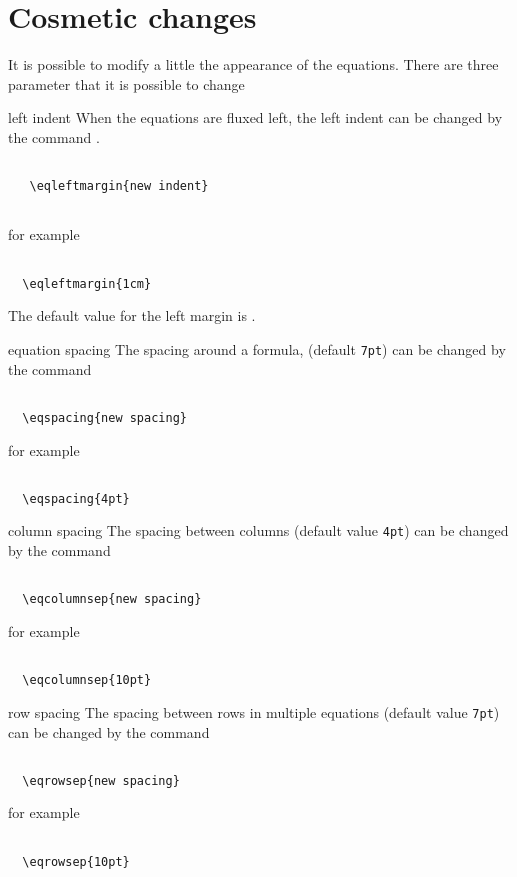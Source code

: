 \documentclass[a4paper]{article}
\begin{document}
\section{Cosmetic changes}
It is possible to modify a little the appearance of the equations.
There are three parameter that it is possible to change
\begin{dotlist}
  \item[left indent] When the equations are fluxed left, the left indent
  can be changed by the command .
\begin{verbatim}
   
   \eqleftmargin{new indent}
	
\end{verbatim}
%    
for example
%
\begin{verbatim}
  
  \eqleftmargin{1cm}

\end{verbatim}
The default value for the left margin is . 

\item[equation spacing] The spacing around a formula,
(default \verb'7pt') can be changed by the command
\begin{verbatim}

  \eqspacing{new spacing}

\end{verbatim}    
for example
\begin{verbatim}
  
  \eqspacing{4pt}

\end{verbatim}
\item[column spacing]
The spacing between columns (default value \verb'4pt') can be changed by the command
\begin{verbatim}

  \eqcolumnsep{new spacing}

\end{verbatim}  
for example
\begin{verbatim}
    
  \eqcolumnsep{10pt}

\end{verbatim}
\item[row spacing] The spacing between rows in multiple
equations (default value \verb'7pt') can be changed by the command
\begin{verbatim}

  \eqrowsep{new spacing}

\end{verbatim}
for example
\begin{verbatim}

  \eqrowsep{10pt}

\end{verbatim}
\end{dotlist}
\end{document}
